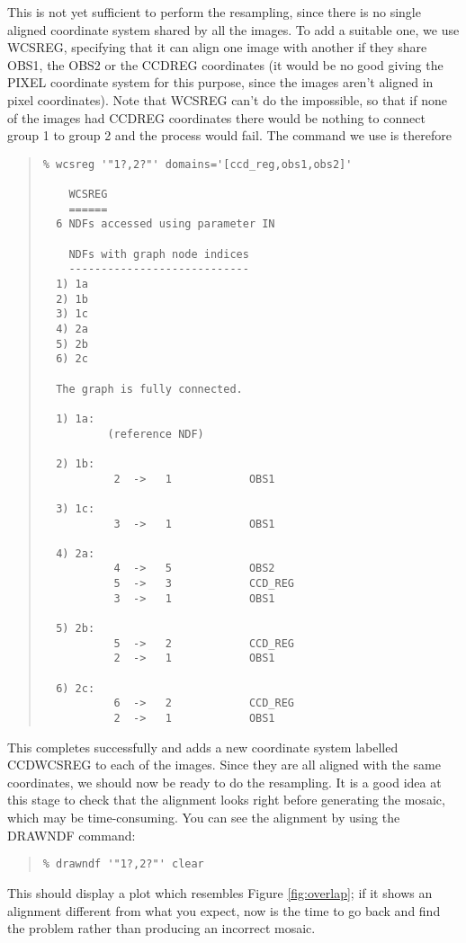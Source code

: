 \documentclass[twoside,11pt]{article}
\newcommand{\hyperref}[4]{#2\ref{#4}#3}
\newcommand{\htmlref}[2]{#1}
\newcommand{\latexhtml}[2]{#1}
\renewcommand{\_}{\texttt{\symbol{95}}}
\newcommand{\ttsize}{\latexhtml{\small}{}}
\newenvironment{myquote}{\begin{quote}\ttsize}{\end{quote}}
\newcommand{\routine}[1]{{\sc #1}}
\newcommand{\xroutine}[1]{\htmlref{{\sc #1}}{#1}}
\begin{document}
This is not yet sufficient to perform the resampling,
since there is no single aligned coordinate system shared by all the images.
To add a suitable one, we use \xroutine{WCSREG},
specifying that it can align one image with another if they share
OBS1, the OBS2 or the CCD\_REG coordinates (it would be no good
giving the PIXEL coordinate system for this purpose, since the images aren't
aligned in pixel coordinates).
Note that \routine{WCSREG} can't do the impossible, so that if
none of the images had CCD\_REG coordinates there would be nothing
to connect group 1 to group 2 and the process would fail.
The command we use is therefore
\begin{myquote}
\begin{verbatim}
% wcsreg '"1?,2?"' domains='[ccd_reg,obs1,obs2]'

    WCSREG
    ======
  6 NDFs accessed using parameter IN

    NDFs with graph node indices
    ----------------------------
  1) 1a
  2) 1b
  3) 1c
  4) 2a
  5) 2b
  6) 2c

  The graph is fully connected.

  1) 1a:
          (reference NDF)

  2) 1b:
           2  ->   1            OBS1

  3) 1c:
           3  ->   1            OBS1

  4) 2a:
           4  ->   5            OBS2
           5  ->   3            CCD_REG
           3  ->   1            OBS1

  5) 2b:
           5  ->   2            CCD_REG
           2  ->   1            OBS1

  6) 2c:
           6  ->   2            CCD_REG
           2  ->   1            OBS1
\end{verbatim}
\end{myquote}
This completes successfully and adds a new coordinate system
labelled CCD\_WCSREG to each of the images.
Since they are all aligned with the same coordinates, we should now be
ready to do the resampling.
It is a good idea at this stage to check that the alignment looks right
before generating the mosaic, which may be time-consuming.
You can see the alignment by using the \xroutine{DRAWNDF}
command:
\begin{myquote}
\begin{verbatim}
% drawndf '"1?,2?"' clear
\end{verbatim}
\end{myquote}
This should display a plot which resembles 
\hyperref{the above figure}{Figure }{}{fig:overlap};
if it shows an alignment different from what you expect, 
now is the time to go back
and find the problem rather than producing an incorrect mosaic.
\end{document}
